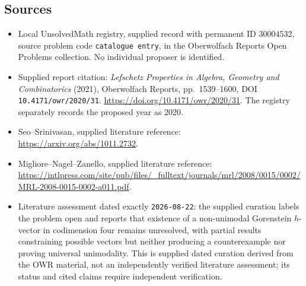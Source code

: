 \documentclass[11pt]{article}
\begin{document}
\subsection{Sources}
\begin{itemize}
\item Local UnsolvedMath registry, supplied record with permanent ID \(30004532\), source problem code \texttt{catalogue entry}, in the Oberwolfach Reports Open Problems collection. No individual proposer is identified.
\item Supplied report citation: \emph{Lefschetz Properties in Algebra, Geometry and Combinatorics} (2021), Oberwolfach Reports, pp.\ 1539--1600, DOI \texttt{10.4171/owr/2020/31}. \url{https://doi.org/10.4171/owr/2020/31}. The registry separately records the proposed year as 2020.
\item Seo--Srinivasan, supplied literature reference: \url{https://arxiv.org/abs/1011.2732}.
\item Migliore--Nagel--Zanello, supplied literature reference: \url{https://intlpress.com/site/pub/files/_fulltext/journals/mrl/2008/0015/0002/MRL-2008-0015-0002-a011.pdf}.
\item Literature assessment dated exactly \texttt{2026-08-22}: the supplied curation labels the problem open and reports that existence of a non-unimodal Gorenstein \(h\)-vector in codimension four remains unresolved, with partial results constraining possible vectors but neither producing a counterexample nor proving universal unimodality. This is supplied dated curation derived from the OWR material, not an independently verified literature assessment; its status and cited claims require independent verification.
\end{itemize}
\end{document}
